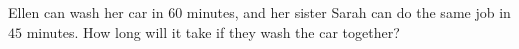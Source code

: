 Ellen can wash her car in $60$ minutes, and her sister Sarah can do the same job in $45$ minutes. How long will it take if they wash the car together?
